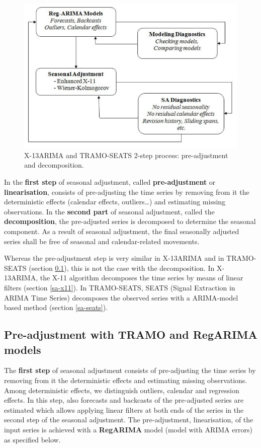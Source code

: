 \documentclass[article]{jss}
\begin{document}
\begin{figure}[htb]
\centering
\includegraphics[scale=0.8]{img/sa_2_steps.PNG} 
\caption{X-13ARIMA and TRAMO-SEATS 2-step process: pre-adjustment and decomposition.}
\label{fig:2_step_proc}
\end{figure}

In the \textbf{first step} of seasonal adjustment, called
\textbf{pre-adjustment} or \textbf{linearisation}, consists of
pre-adjusting the time series by removing from it the deterministic
effects (calendar effects, outliers\ldots{}) and estimating missing
observations. In the \textbf{second part} of seasonal adjustment, called
the \textbf{decomposition}, the pre-adjusted series is decomposed to
determine the seasonal component. As a result of seasonal adjustment,
the final seasonally adjusted series shall be free of seasonal and
calendar-related movements.

Whereas the pre-adjustment step is very similar in X-13ARIMA and in
TRAMO-SEATS (section \ref{pre-adjustment}), this is not the case with
the decomposition. In X-13ARIMA, the X-11 algorithm decomposes the time
series by means of linear filters (section \ref{sa-x11}). In
TRAMO-SEATS, SEATS (Signal Extraction in ARIMA Time Series) decomposes
the observed series with a ARIMA-model based method (section
\ref{sa-seats}).

\hypertarget{pre-adjustment}{%
\subsection{Pre-adjustment with TRAMO and RegARIMA
models}\label{pre-adjustment}}

The \textbf{first step} of seasonal adjustment consists of pre-adjusting
the time series by removing from it the deterministic effects and
estimating missing observations. Among deterministic effects, we
distinguish outliers, calendar and regression effects. In this step,
also forecasts and backcasts of the pre-adjusted series are estimated
which allows applying linear filters at both ends of the series in the
second step of the seasonal adjustment. The pre-adjustment,
linearisation, of the input series is achieved with a \textbf{RegARIMA}
model (model with ARIMA errors) as specified below.
\end{document}
